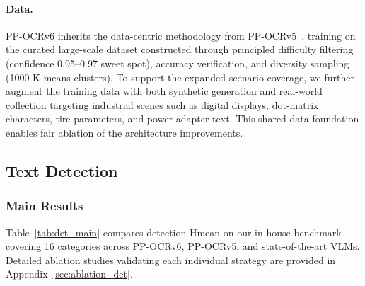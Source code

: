 \documentclass[11pt, a4paper,logo,  copyright, nonumbering]{paddleocr}
\begin{document}
\paragraph{Data.}
PP-OCRv6 inherits the data-centric methodology from PP-OCRv5~\cite{cui2026pp}, training on the curated large-scale dataset constructed through principled difficulty filtering (confidence 0.95--0.97 sweet spot), accuracy verification, and diversity sampling (1000 K-means clusters). To support the expanded scenario coverage, we further augment the training data with both synthetic generation and real-world collection targeting industrial scenes such as digital displays, dot-matrix characters, tire parameters, and power adapter text. This shared data foundation enables fair ablation of the architecture improvements.


\subsection{Text Detection}
\subsubsection{Main Results}

Table~\ref{tab:det_main} compares detection Hmean on our in-house benchmark covering 16 categories across PP-OCRv6, PP-OCRv5, and state-of-the-art VLMs. Detailed ablation studies validating each individual strategy are provided in Appendix~\ref{sec:ablation_det}.
\end{document}
